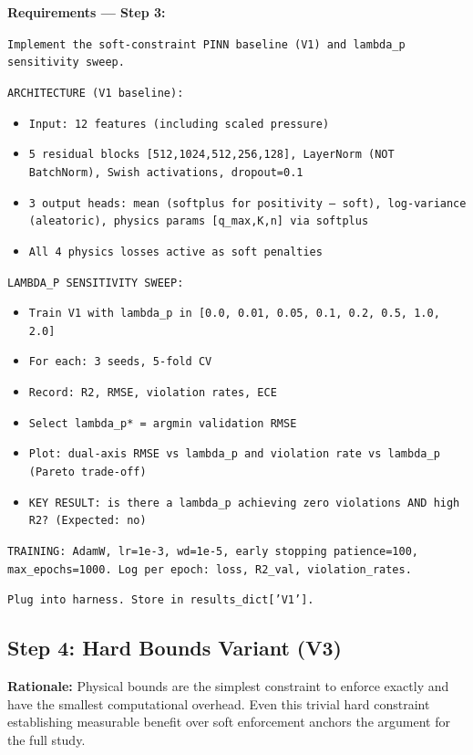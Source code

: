 \documentclass[12pt,a4paper]{article}
\begin{document}
\begin{promptbox}
\textbf{Requirements --- Step 3:}

\texttt{Implement the soft-constraint PINN baseline (V1) and lambda\_p
sensitivity sweep.}

\texttt{ARCHITECTURE (V1 baseline):}
\begin{itemize}[noitemsep]
  \item \texttt{Input: 12 features (including scaled pressure)}
  \item \texttt{5 residual blocks [512,1024,512,256,128],
    LayerNorm (NOT BatchNorm), Swish activations, dropout=0.1}
  \item \texttt{3 output heads: mean (softplus for positivity --- soft),
    log-variance (aleatoric), physics params [q\_max,K,n] via softplus}
  \item \texttt{All 4 physics losses active as soft penalties}
\end{itemize}

\texttt{LAMBDA\_P SENSITIVITY SWEEP:}
\begin{itemize}[noitemsep]
  \item \texttt{Train V1 with lambda\_p in [0.0, 0.01, 0.05, 0.1,
    0.2, 0.5, 1.0, 2.0]}
  \item \texttt{For each: 3 seeds, 5-fold CV}
  \item \texttt{Record: R2, RMSE, violation rates, ECE}
  \item \texttt{Select lambda\_p* = argmin validation RMSE}
  \item \texttt{Plot: dual-axis RMSE vs lambda\_p and violation rate
    vs lambda\_p (Pareto trade-off)}
  \item \texttt{KEY RESULT: is there a lambda\_p achieving zero
    violations AND high R2? (Expected: no)}
\end{itemize}

\texttt{TRAINING: AdamW, lr=1e-3, wd=1e-5, early stopping patience=100,
max\_epochs=1000. Log per epoch: loss, R2\_val, violation\_rates.}

\texttt{Plug into harness. Store in results\_dict['V1'].}
\end{promptbox}

\subsection{Step 4: Hard Bounds Variant (V3)}

\begin{rationalebox}
\textbf{Rationale:} Physical bounds are the simplest constraint to
enforce exactly and have the smallest computational overhead. Even this
trivial hard constraint establishing measurable benefit over soft
enforcement anchors the argument for the full study.
\end{rationalebox}
\end{document}
